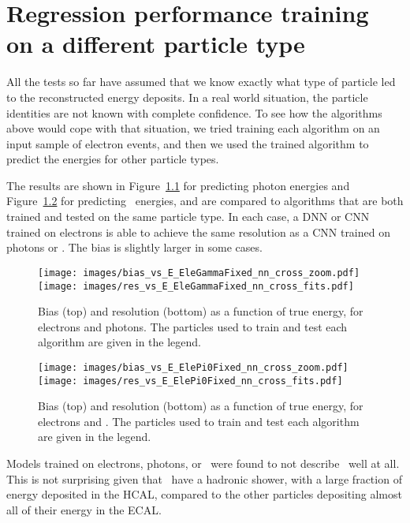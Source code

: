 \chapter{Regression performance training on a different particle type}\label{app:xtrain_regression}

All the tests so far have assumed that we know exactly what type of particle led to the reconstructed energy deposits.  In a real world situation, the particle identities are not known with complete confidence.  To see how the algorithms above would cope with that situation, we tried training each algorithm on an input sample of electron events, and then we used the trained algorithm to predict the energies for other particle types.

The results are shown in Figure~\ref{fig:reg_nn_cross_gamma} for predicting photon energies and Figure~\ref{fig:reg_nn_cross_pi0} for predicting \pizero\ energies, and are compared to algorithms that are both trained and tested on the same particle type.  In each case, a DNN or CNN trained on electrons is able to achieve the same resolution as a CNN trained on photons or \pizero.  The bias is slightly larger in some cases.

\begin{figure}[hbp]
\centering
\texttt{[image: images/bias\_vs\_E\_EleGammaFixed\_nn\_cross\_zoom.pdf]}
\texttt{[image: images/res\_vs\_E\_EleGammaFixed\_nn\_cross\_fits.pdf]}
\caption{Bias (top) and resolution (bottom) as a function of true energy, for electrons and photons.  The particles used to train and test each algorithm are given in the legend.
}
\label{fig:reg_nn_cross_gamma}
\end{figure}

\begin{figure}[htbp]
\centering
\texttt{[image: images/bias\_vs\_E\_ElePi0Fixed\_nn\_cross\_zoom.pdf]}
\texttt{[image: images/res\_vs\_E\_ElePi0Fixed\_nn\_cross\_fits.pdf]}
\caption{Bias (top) and resolution (bottom) as a function of true energy, for electrons and \pizero.  The particles used to train and test each algorithm are given in the legend.
}
\label{fig:reg_nn_cross_pi0}
\end{figure}

Models trained on electrons, photons, or \pizero\ were found to not describe \chpi\ well at all.  This is not surprising given that \chpi\ have a hadronic shower, with a large fraction of energy deposited in the HCAL, compared to the other particles depositing almost all of their energy in the ECAL.

